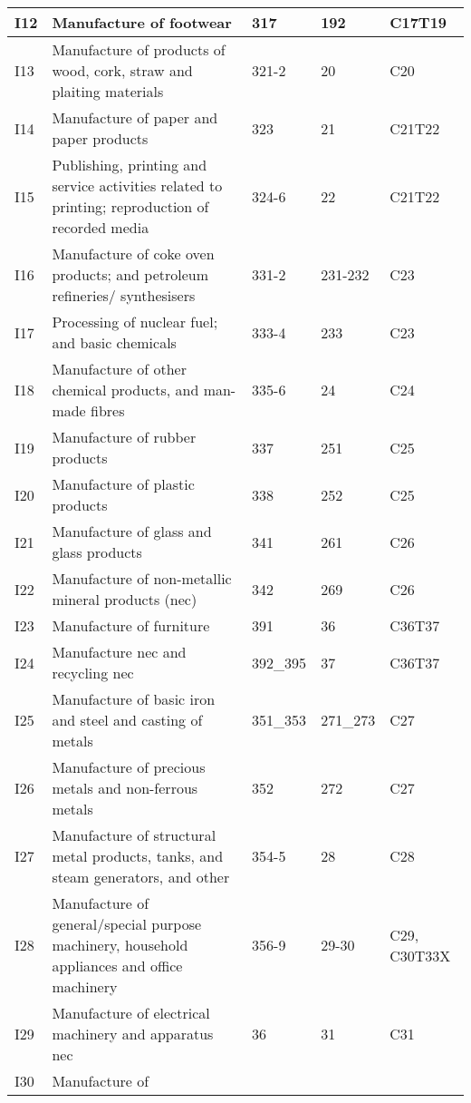 \documentclass[12pt,english]{article}
\begin{document}
\begin{table}[ht]
\begin{adjustbox}{width=\textwidth}
\begin{tabular}{lp{500pt}lll}
		I12 & Manufacture of footwear & 317 & 192 & C17T19 \\ \midrule
		I13 & Manufacture of products of wood, cork, straw and plaiting materials%
		& 321-2 & 20 & C20 \\ \midrule
		I14 & Manufacture of paper and paper products & 323 & 21 & C21T22 \\ \midrule
		I15 & Publishing, printing and service activities related to printing; reproduction of recorded media & 324-6 & 22 & C21T22 \\ \midrule
		I16 & Manufacture of coke oven products; and petroleum refineries/ synthesisers & 331-2 & 231-232 & C23 \\ \midrule
		I17 & Processing of nuclear fuel; and basic chemicals & 333-4 & 233 & C23 \\ \midrule
		I18 & Manufacture of other chemical products, and man-made fibres & 335-6 & 24 & C24 \\ \midrule
		I19 & Manufacture of rubber products & 337 & 251 & C25 \\ \midrule
		I20 & Manufacture of plastic products & 338 & 252 & C25 \\ \midrule
		I21 & Manufacture of glass and glass products & 341 & 261 & C26 \\ \midrule
		I22 & Manufacture of non-metallic mineral products (nec) & 342 & 269 & C26 \\ \midrule
		I23 & Manufacture of furniture & 391 & 36 & C36T37 \\ \midrule
		I24 & Manufacture nec and recycling nec & 392\_395 & 37 & C36T37 \\ \midrule
		I25 & Manufacture of basic iron and steel and casting of metals & 351\_353 & 271\_273 & C27 \\ \midrule
		I26 & Manufacture of precious metals and non-ferrous metals & 352 & 272 & C27 \\ \midrule
		I27 & Manufacture of structural metal products, tanks, %
		and steam generators, and other %
		& 354-5 & 28 & C28 \\ \midrule
		I28 & Manufacture of general/special purpose machinery, %
		household appliances and office %
		machinery & 356-9 & 29-30 & C29, C30T33X \\ \midrule
		I29 & Manufacture of electrical machinery and apparatus nec & 36 & 31 & C31 \\ \midrule
		I30 & Manufacture of %

\end{tabular}
\end{adjustbox}
\end{table}
\end{document}
